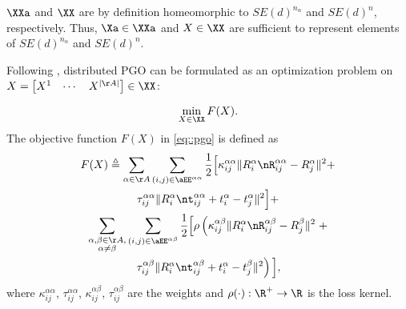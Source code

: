 \begin{remark}
	$\XXa$ and $\XX$ are by definition homeomorphic to $SE(d)^{n_\alpha}$ and $SE(d)^n$, respectively. Thus, $\Xa\in\XXa$ and $X\in\XX$ are sufficient to represent elements of $SE(d)^{n_\alpha}$ and $SE(d)^n$.
\end{remark}

Following \cite{rosen2016se,fan2020mm,fan2019proximal}, distributed PGO can be formulated as an optimization problem on $X=\begin{bmatrix}
	X^1 & \cdots & X^{|\AA|}
\end{bmatrix}\in \XX$:
\begin{problem}
\begin{equation}\label{eq::pgo}
	\min_{X\in \XX} F(X).
\end{equation}
The objective function $F(X)$ in \cref{eq::pgo} is defined as
\begin{multline}\label{eq::obj}
F(X)\triangleq \sum_{\alpha\in\AA}\sum_{(i,j)\in \aEE^{\alpha\alpha}}\frac{1}{2}\Big[\kappa_{ij}^{\alpha\alpha}\|R_i^\alpha \nR_{ij}^{\alpha\alpha} -R_j^\alpha\|^2 +\\ \tau_{ij}^{\alpha\alpha}\|R_i^\alpha \nt_{ij}^{\alpha\alpha}+t_i^\alpha - t_j^\alpha\|^2\Big]+\\
\sum_{\substack{\alpha,\beta\in\AA,\\
		\alpha\neq \beta}}\sum_{(i,j)\in \aEE^{\alpha\beta}}\frac{1}{2}\Big[\rho\left(\kappa_{ij}^{\alpha\beta}\|R_i^\alpha \nR_{ij}^{\alpha\beta} -R_j^\beta\|^2\right. +\\ 
\left.\tau_{ij}^{\alpha\beta}\|R_i^\alpha \nt_{ij}^{\alpha\beta}+t_i^\alpha - t_j^\beta\|^2\right)\Big],
\end{multline}
where $\kappa_{ij}^{\alpha\alpha}$, $\tau_{ij}^{\alpha\alpha}$, $\kappa_{ij}^{\alpha\beta}$, $\tau_{ij}^{\alpha\beta}$ are the weights and $\rho(\cdot):\R^+\rightarrow\R$ is the loss kernel. 
\end{problem}

